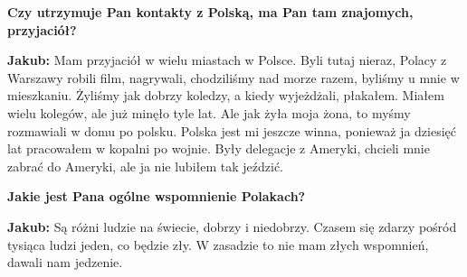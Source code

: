 \begin{otherlanguage}{polish}
\textbf{Czy utrzymuje Pan kontakty z Polską, ma Pan tam znajomych, przyjaciół?} 

\textbf{Jakub:} Mam przyjaciół w wielu miastach w Polsce. Byli tutaj nieraz, Polacy z Warszawy robili film, nagrywali, chodziliśmy nad morze razem, byliśmy u mnie w mieszkaniu. Żyliśmy jak dobrzy koledzy, a kiedy wyjeżdżali, płakałem. Miałem wielu kolegów, ale już minęło tyle lat. Ale jak żyła moja żona, to myśmy rozmawiali w domu po polsku. Polska jest mi jeszcze winna, ponieważ ja dziesięć lat pracowałem w kopalni po wojnie. Były delegacje z Ameryki, chcieli mnie zabrać do Ameryki, ale ja nie lubiłem tak jeździć. 

\textbf{Jakie jest Pana ogólne wspomnienie Polakach?}

\textbf{Jakub:} Są różni ludzie na świecie, dobrzy i niedobrzy. Czasem się zdarzy pośród tysiąca ludzi jeden, co będzie zły. W zasadzie to nie mam złych wspomnień, dawali nam jedzenie. 
\end{otherlanguage}